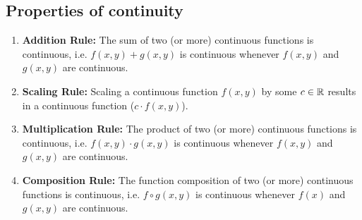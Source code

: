 \subsection{Properties of continuity}
\begin{enumerate}
    \item \textbf{Addition Rule:}
    The sum of two (or more) continuous functions is continuous, i.e. $f(x, y) + g(x, y)$ is continuous whenever
    $f(x, y)$ and $g(x, y)$ are continuous.

    \item \textbf{Scaling Rule:}
    Scaling a continuous function $f(x, y)$ by some $c \in \mathbb{R}$ results in a continuous function ($c \cdot f(x, y)$).

    \item \textbf{Multiplication Rule:}
    The product of two (or more) continuous functions is continuous, i.e. $f(x, y) \cdot g(x, y)$ is continuous whenever
    $f(x, y)$ and $g(x, y)$ are continuous.

    \item \textbf{Composition Rule:}
    The function composition of two (or more) continuous functions is continuous, i.e. $f \circ g(x, y)$ is continuous whenever
    $f(x)$ and $g(x, y)$ are continuous.
\end{enumerate}